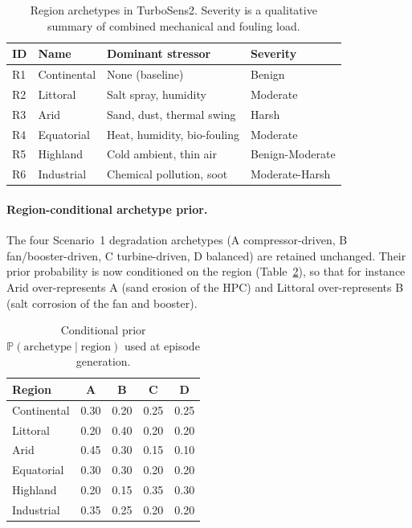 \begin{table}[h]
\centering
\caption{Region archetypes in TurboSens2. Severity is a qualitative
summary of combined mechanical and fouling load.}
\label{tab:regions}
\small
\begin{tabular}{llll}
\toprule
ID & Name & Dominant stressor & Severity \\
\midrule
R1 & Continental & None (baseline)               & Benign          \\
R2 & Littoral    & Salt spray, humidity          & Moderate        \\
R3 & Arid        & Sand, dust, thermal swing     & Harsh           \\
R4 & Equatorial  & Heat, humidity, bio-fouling   & Moderate        \\
R5 & Highland    & Cold ambient, thin air        & Benign-Moderate \\
R6 & Industrial  & Chemical pollution, soot      & Moderate-Harsh  \\
\bottomrule
\end{tabular}
\end{table}

\paragraph{Region-conditional archetype prior.}
The four Scenario~1 degradation archetypes (A compressor-driven,
B fan/booster-driven, C turbine-driven, D balanced) are retained
unchanged. Their prior probability is now conditioned on the region
(Table~\ref{tab:region_archetype_prior}), so that for instance Arid
over-represents A (sand erosion of the HPC) and Littoral over-represents
B (salt corrosion of the fan and booster).

\begin{table}[h]
\centering
\caption{Conditional prior $\mathbb{P}(\text{archetype}\mid\text{region})$
used at episode generation.}
\label{tab:region_archetype_prior}
\small
\begin{tabular}{lcccc}
\toprule
Region & A & B & C & D \\
\midrule
Continental & 0.30 & 0.20 & 0.25 & 0.25 \\
Littoral    & 0.20 & 0.40 & 0.20 & 0.20 \\
Arid        & 0.45 & 0.30 & 0.15 & 0.10 \\
Equatorial  & 0.30 & 0.30 & 0.20 & 0.20 \\
Highland    & 0.20 & 0.15 & 0.35 & 0.30 \\
Industrial  & 0.35 & 0.25 & 0.20 & 0.20 \\
\bottomrule
\end{tabular}
\end{table}

